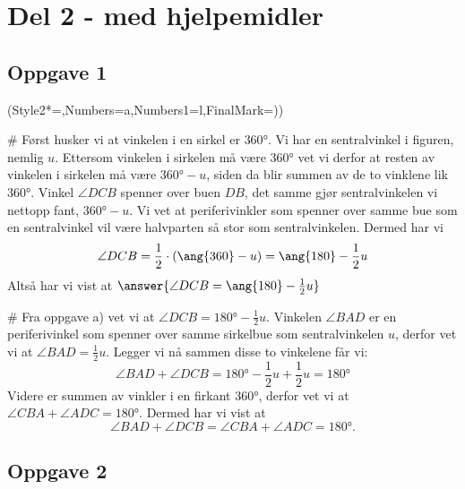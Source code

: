 \clearpage 
\section*{Del 2 - med hjelpemidler}

\subsection*{Oppgave 1}
\begin{easylist}[enumerate]
	\ListProperties(Style2*=,Numbers=a,Numbers1=l,FinalMark={)})
	
	# Først husker vi at vinkelen i en sirkel er $\ang{360}$. 
	Vi har en sentralvinkel i figuren, nemlig $u$. 
	Ettersom vinkelen i sirkelen må være $\ang{360}$ vet vi derfor at resten av vinkelen i sirkelen må være $\ang{360} - u$, siden da blir summen av de to vinklene lik $\ang{360}$. 
	Vinkel $\angle DCB$ spenner over buen $DB$, det samme gjør sentralvinkelen vi nettopp fant, $\ang{360} - u$. 
	Vi vet at periferivinkler som spenner over samme bue som en sentralvinkel vil være halvparten så stor som sentralvinkelen. 
	Dermed har vi 
	\begin{equation*}
		\angle DCB = \frac{1}{2} \cdot (\ang{360} - u) \\ = \ang{180} - \frac{1}{2}u
	\end{equation*}
	Altså har vi vist at $\answer{\angle DCB = \ang{180} - \frac{1}{2}u}$
	
	# Fra oppgave a) vet vi at $\angle DCB = \ang{180} - \frac{1}{2}u$. Vinkelen $\angle BAD$ er en periferivinkel som spenner over samme sirkelbue som sentralvinkelen $u$, derfor vet vi at  $\angle BAD = \frac{1}{2}u$. Legger vi nå sammen disse to vinkelene får vi:
	\begin{equation*}
		\angle BAD + \angle DCB = \ang{180} - \frac{1}{2}u + \frac{1}{2}u = \ang{180}
	\end{equation*}
	Videre er summen av vinkler i en firkant $\ang{360}$, derfor vet vi at $\angle CBA + \angle ADC = \ang{180}$.
	Dermed har vi vist at 
	\begin{equation*}
		\angle BAD + \angle DCB = \angle CBA + \angle ADC = \ang{180}.
	\end{equation*}
	
	
\end{easylist}
\subsection*{Oppgave 2}

